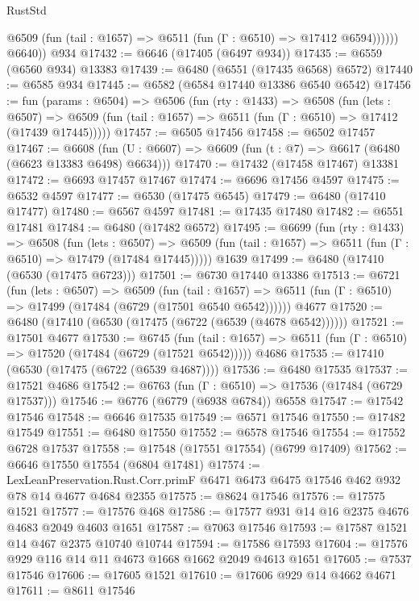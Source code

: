 \begin{lexlean}{RustStd}
\begin{coremodule}
              @6509 (fun (tail : @1657) => @6511 (fun (Γ : @6510) => @17412 @6594))))))
        @6640))
    @934
@17432 := @6646 (@17405 (@6497 @934))
@17435 := @6559 (@6560 @934) @13383
@17439 := @6480 (@6551 (@17435 @6568) @6572)
@17440 := @6585 @934
@17445 := @6582 (@6584 @17440 @13386 @6540 @6542)
@17456 := fun (params : @6504) =>
  @6506
    (fun (rty : @1433) =>
    @6508
      (fun (lets : @6507) =>
      @6509 (fun (tail : @1657) => @6511 (fun (Γ : @6510) => @17412 (@17439 @17445)))))
@17457 := @6505 @17456
@17458 := @6502 @17457
@17467 := @6608
    (fun (U : @6607) => @6609 (fun (t : @7) => @6617 (@6480 (@6623 @13383 @6498) @6634)))
@17470 := @17432 (@17458 @17467) @13381
@17472 := @6693 @17457 @17467
@17474 := @6696 @17456 @4597
@17475 := @6532 @4597
@17477 := @6530 (@17475 @6545)
@17479 := @6480 (@17410 @17477)
@17480 := @6567 @4597
@17481 := @17435 @17480
@17482 := @6551 @17481
@17484 := @6480 (@17482 @6572)
@17495 := @6699
    (fun (rty : @1433) =>
    @6508
      (fun (lets : @6507) =>
      @6509 (fun (tail : @1657) => @6511 (fun (Γ : @6510) => @17479 (@17484 @17445)))))
    @1639
@17499 := @6480 (@17410 (@6530 (@17475 @6723)))
@17501 := @6730 @17440 @13386
@17513 := @6721
    (fun (lets : @6507) =>
    @6509
      (fun (tail : @1657) =>
      @6511 (fun (Γ : @6510) => @17499 (@17484 (@6729 (@17501 @6540 @6542))))))
    @4677
@17520 := @6480 (@17410 (@6530 (@17475 (@6722 (@6539 (@4678 @6542))))))
@17521 := @17501 @4677
@17530 := @6745
    (fun (tail : @1657) => @6511 (fun (Γ : @6510) => @17520 (@17484 (@6729 (@17521 @6542)))))
    @4686
@17535 := @17410 (@6530 (@17475 (@6722 (@6539 @4687))))
@17536 := @6480 @17535
@17537 := @17521 @4686
@17542 := @6763 (fun (Γ : @6510) => @17536 (@17484 (@6729 @17537)))
@17546 := @6776 (@6779 (@6938 @6784)) @6558
@17547 := @17542 @17546
@17548 := @6646 @17535
@17549 := @6571 @17546
@17550 := @17482 @17549
@17551 := @6480 @17550
@17552 := @6578 @17546
@17554 := @17552 @6728 @17537
@17558 := @17548 (@17551 @17554) (@6799 @17409)
@17562 := @6646 @17550 @17554 (@6804 @17481)
@17574 := LexLeanPreservation.Rust.Corr.primF
    @6471
    @6473
    @6475
    @17546
    @462
    @932
    @78
    @14
    @4677
    @4684
    @2355
@17575 := @8624 @17546
@17576 := @17575 @1521
@17577 := @17576 @468
@17586 := @17577 @931 @14 @16 @2375 @4676 @4683 @2049 @4603 @1651
@17587 := @7063 @17546
@17593 := @17587 @1521 @14 @467 @2375 @10740 @10744
@17594 := @17586 @17593
@17604 := @17576 @929 @116 @14 @11 @4673 @1668 @1662 @2049 @4613 @1651
@17605 := @7537 @17546
@17606 := @17605 @1521
@17610 := @17606 @929 @14 @4662 @4671
@17611 := @8611 @17546

\end{coremodule}
\end{lexlean}
